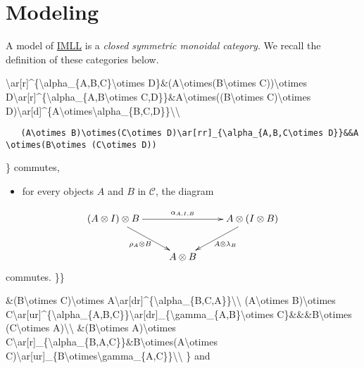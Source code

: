 \section{\texorpdfstring{Modeling }{Modeling IMLL}}\label{modeling-imll}

A model of \url{IMLL} is a \emph{closed symmetric monoidal category}. We
recall the definition of these categories below.

\textbackslash{}ar{[}r{]}\^{}\{\textbackslash{}alpha\_\{A,B,C\}\textbackslash{}otimes
D\}\&(A\textbackslash{}otimes(B\textbackslash{}otimes
C))\textbackslash{}otimes
D\textbackslash{}ar{[}r{]}\^{}\{\textbackslash{}alpha\_\{A,B\textbackslash{}otimes
C,D\}\}\&A\textbackslash{}otimes((B\textbackslash{}otimes
C)\textbackslash{}otimes
D)\textbackslash{}ar{[}d{]}\^{}\{A\textbackslash{}otimes\textbackslash{}alpha\_\{B,C,D\}\}\textbackslash{}\textbackslash{}

\texttt{~~~(A\textbackslash{}otimes~B)\textbackslash{}otimes(C\textbackslash{}otimes~D)\textbackslash{}ar{[}rr{]}\_\{\textbackslash{}alpha\_\{A,B,C\textbackslash{}otimes~D\}\}\&\&A\textbackslash{}otimes(B\textbackslash{}otimes~(C\textbackslash{}otimes~D))}

\} commutes,

\begin{itemize}
\tightlist
\item
  for every objects \(A\) and \(B\) in \(\mathcal{C}\), the diagram
\end{itemize}

\[\xymatrix{
    (A\otimes I)\otimes B\ar[dr]_{\rho_A\otimes B}\ar[rr]^{\alpha_{A,I,B}}& & \ar[dl]^{A\otimes\lambda_B}A\otimes(I\otimes B)\\
    & A\otimes B& 
}\] commutes. \}\}

\&(B\textbackslash{}otimes C)\textbackslash{}otimes
A\textbackslash{}ar{[}dr{]}\^{}\{\textbackslash{}alpha\_\{B,C,A\}\}\textbackslash{}\textbackslash{}
(A\textbackslash{}otimes B)\textbackslash{}otimes
C\textbackslash{}ar{[}ur{]}\^{}\{\textbackslash{}alpha\_\{A,B,C\}\}\textbackslash{}ar{[}dr{]}\_\{\textbackslash{}gamma\_\{A,B\}\textbackslash{}otimes
C\}\&\&\&B\textbackslash{}otimes (C\textbackslash{}otimes
A)\textbackslash{}\textbackslash{} \&(B\textbackslash{}otimes
A)\textbackslash{}otimes
C\textbackslash{}ar{[}r{]}\_\{\textbackslash{}alpha\_\{B,A,C\}\}\&B\textbackslash{}otimes(A\textbackslash{}otimes
C)\textbackslash{}ar{[}ur{]}\_\{B\textbackslash{}otimes\textbackslash{}gamma\_\{A,C\}\}\textbackslash{}\textbackslash{}
\} and

